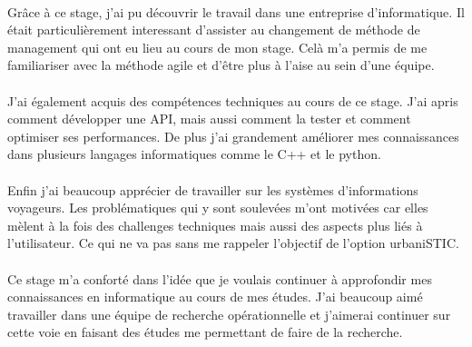\documentclass[a4paper]{report}
\begin{document}
\paragraph{} Grâce à ce stage, j'ai pu découvrir le travail dans une entreprise d'informatique. Il était particulièrement interessant d'assister au changement de méthode de management qui ont eu lieu au cours de mon stage. Celà m'a permis de me familiariser avec la méthode agile et d'être plus à l'aise au sein d'une équipe.

\paragraph{} J'ai également acquis des compétences techniques au cours de ce stage. J'ai apris comment développer une API, mais aussi comment la tester et comment optimiser ses performances. De plus j'ai grandement améliorer mes connaissances dans plusieurs langages informatiques comme le C++ et le python.

\paragraph{} Enfin j'ai beaucoup apprécier de travailler sur les systèmes d'informations voyageurs. Les problématiques qui y sont soulevées m'ont motivées car elles mèlent à la fois des challenges techniques mais aussi des aspects plus liés à l'utilisateur. Ce qui ne va pas sans me rappeler l'objectif de l'option urbaniSTIC. 

\paragraph{} Ce stage m'a conforté dans l'idée que je voulais continuer à approfondir mes connaissances en informatique au cours de mes études. J'ai beaucoup aimé travailler dans une équipe de recherche opérationnelle et j'aimerai continuer sur cette voie en faisant des études me permettant de faire de la recherche.

\appendix
\listoffigures
{}


\end{document}
